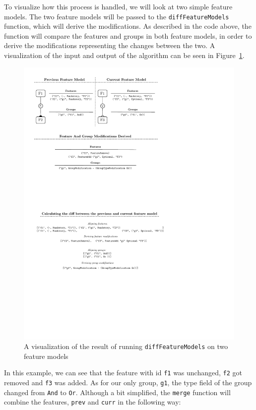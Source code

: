 \documentclass[a4paper,english]{ifimaster}
\begin{document}
To visualize how this process is handled, we will look at two simple feature models. The two feature models will be passed to the \texttt{diffFeatureModels} function, which will derive the modifications. As described in the code above, the function will compare the features and groups in both feature models, in order to derive the modifications representing the changes between the two. A visualization of the input and output of the algorithm can be seen in Figure~\ref{fig:diff_feature_models_visualized}.

\begin{figure}[htpb]
  \centering
  \includegraphics[]{feature_model_diff_visualized.pdf}
  \caption{A visualization of the result of running \texttt{diffFeatureModels} on two feature models}%
  \label{fig:diff_feature_models_visualized}
\end{figure}

In this example, we can see that the feature with id \texttt{f1} was unchanged, \texttt{f2} got removed and \texttt{f3} was added. As for our only group, \texttt{g1}, the type field of the group changed from \texttt{And} to \texttt{Or}. Although a bit simplified, the \texttt{merge} function will combine the features, \texttt{prev} and \texttt{curr} in the following way:
\end{document}
